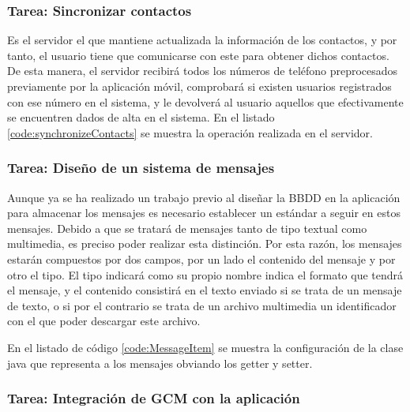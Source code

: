 


\subsubsection{Tarea: Sincronizar contactos}

Es el servidor el que mantiene actualizada la información de los contactos, y por tanto, el usuario tiene que comunicarse con este para obtener dichos contactos. De esta manera, el servidor recibirá todos los números de teléfono preprocesados previamente por la aplicación móvil, comprobará si existen usuarios registrados con ese número en el sistema, y le devolverá al usuario aquellos que efectivamente se encuentren dados de alta en el sistema. En el listado \ref{code:synchronizeContacts} se muestra la operación realizada en el servidor.



\subsubsection{Tarea: Diseño de un sistema de mensajes}

Aunque ya se ha realizado un trabajo previo al diseñar la \ac{BBDD} en la aplicación para almacenar los mensajes es necesario establecer un estándar a seguir en estos mensajes. Debido a que se tratará de mensajes tanto de tipo textual como multimedia, es preciso poder realizar esta distinción. Por esta razón, los mensajes estarán compuestos por dos campos, por un lado el contenido del mensaje y por otro el tipo. El tipo indicará como su propio nombre indica el formato que tendrá el mensaje, y el contenido consistirá en el texto enviado si se trata de un mensaje de texto, o si por el contrario se trata de un archivo multimedia un identificador con el que poder descargar este archivo.

En el listado de código \ref{code:MessageItem} se muestra la configuración de la clase java que representa a los mensajes obviando los getter y setter.



\subsubsection{Tarea: Integración de \ac{GCM} con la aplicación}

